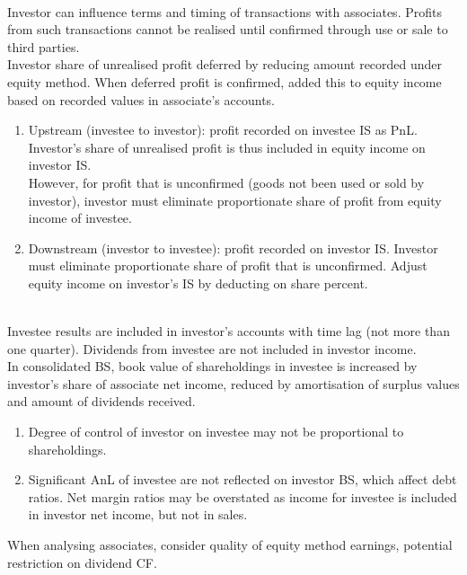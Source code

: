 \begin{remark} \\
Investor can influence terms and timing of transactions with associates. Profits from such transactions cannot be realised until confirmed through use or sale to third parties.\\
Investor share of unrealised profit deferred by reducing amount recorded under equity method. When deferred profit is confirmed, added this to equity income based on recorded values in associate’s accounts.
\begin{enumerate}[label=\roman*.]
\setlength{\itemsep}{0pt}
\item Upstream (investee to investor): profit recorded on investee IS as PnL. Investor’s share of unrealised profit is thus included in equity income on investor IS.\\
However, for profit that is unconfirmed (goods not been used or sold by investor), investor must eliminate proportionate share of profit from equity income of investee.
\item Downstream (investor to investee): profit recorded on investor IS. Investor must eliminate proportionate share of profit that is unconfirmed. Adjust equity income on investor’s IS by deducting on share percent.
\end{enumerate}
\end{remark}

\begin{remark} \\
Investee results are included in investor’s accounts with time lag (not more than one quarter). Dividends from investee are not included in investor income.\\
In consolidated BS, book value of shareholdings in investee is increased by investor’s share of associate net income, reduced by amortisation of surplus values and amount of dividends received.
\end{remark}

\begin{remark} 
\begin{enumerate}[label=\roman*.]
\setlength{\itemsep}{0pt}
\item Degree of control of investor on investee may not be proportional to shareholdings.
\item Significant AnL of investee are not reflected on investor BS, which affect debt ratios. Net margin ratios may be overstated as income for investee is included in investor net income, but not in sales.
\end{enumerate}
When analysing associates, consider quality of equity method earnings, potential restriction on dividend CF.
\end{remark}

